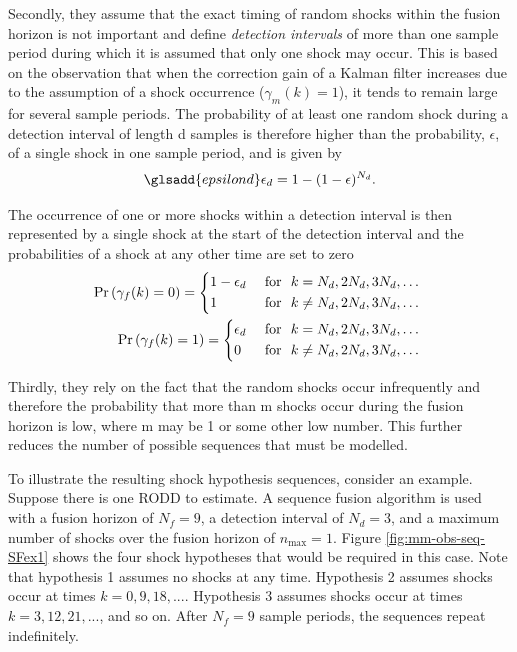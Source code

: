 Secondly, they assume that the exact timing of random shocks within the fusion horizon is not important and define \textit{detection intervals} of more than one sample period during which it is assumed that only one shock may occur. This is based on the observation that when the correction gain of a Kalman filter increases due to the assumption of a shock occurrence ($\gamma_m(k)=1$), it tends to remain large for several sample periods. The probability of at least one random shock during a detection interval of length \gls{d} samples is therefore higher than the probability, $\epsilon$, of a single shock in one sample period, and is given by
\begin{equation}  \label{eq:p_gamma_d}
	\glsadd{epsilond}\epsilon_d = 1 - (1 - \epsilon)^{N_d}.
\end{equation}

The occurrence of one or more shocks within a detection interval is then represented by a single shock at the start of the detection interval and the probabilities of a shock at any other time are set to zero
\begin{equation} \label{eq:Pr_gamma_nd}
	\begin{aligned}
		\Pr\left(\gamma_{f}(k)=0\right) = \begin{cases*}
			1 - \epsilon_d & \text { for } $k = N_d, 2N_d, 3N_d, \ldots$ \\
			1 & \text { for } $k \ne N_d, 2N_d, 3N_d, \ldots$
		\end{cases*} \\
		\Pr\left(\gamma_{f}(k)=1\right) = \begin{cases*}
			\epsilon_d & \text { for } $k = N_d, 2N_d, 3N_d, \ldots$ \\
			0 & \text { for } $k \ne N_d, 2N_d, 3N_d, \ldots$
		\end{cases*} \\
	\end{aligned}
\end{equation}

Thirdly, they rely on the fact that the random shocks occur infrequently and therefore the probability that more than \gls{m} shocks occur during the fusion horizon is low, where \gls{m} may be 1 or some other low number. This further reduces the number of possible sequences that must be modelled.

To illustrate the resulting shock hypothesis sequences, consider an example. Suppose there is one \gls{RODD} to estimate. A sequence fusion algorithm is used with a fusion horizon of $N_f=9$, a detection interval of $N_d=3$, and a maximum number of shocks over the fusion horizon of $n_\text{max}=1$. Figure \ref{fig:mm-obs-seq-SFex1} shows the four shock hypotheses that would be required in this case. Note that hypothesis 1 assumes no shocks at any time. Hypothesis 2 assumes shocks occur at times $k=0,9,18,...$. Hypothesis 3 assumes shocks occur at times $k=3,12,21,...$, and so on. After $N_f=9$ sample periods, the sequences repeat indefinitely.

